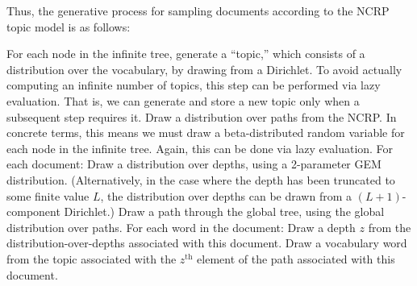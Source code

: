 \documentclass{article}
\newcommand{\nth}{^{\text{th}}}
\begin{document}
Thus, the generative process for sampling documents according to the NCRP topic model is as follows:
\begin{outline}
\1 For each node in the infinite tree, generate a ``topic,'' which consists of a distribution over the vocabulary, by drawing from a Dirichlet.
To avoid actually computing an infinite number of topics, this step can be performed via lazy evaluation.
That is, we can generate and store a new topic only when a subsequent step requires it.
%
\1 Draw a distribution over paths from the NCRP.
In concrete terms, this means we must draw a beta-distributed random variable for each node in the infinite tree.
Again, this can be done via lazy evaluation.
%
\1 For each document:
  \2 Draw a distribution over depths, using a 2-parameter GEM distribution.  (Alternatively, in the case where the depth has been truncated to some finite value $L$, the distribution over depths can be drawn from a $(L+1)$-component Dirichlet.)
  \2 Draw a path through the global tree, using the global distribution over paths.
  \2 For each word in the document:
    \3 Draw a depth $z$ from the distribution-over-depths associated with this document.
    \3 Draw a vocabulary word from the topic associated with the $z\nth$ element of the path associated with this document.
\end{outline}

\end{document}
